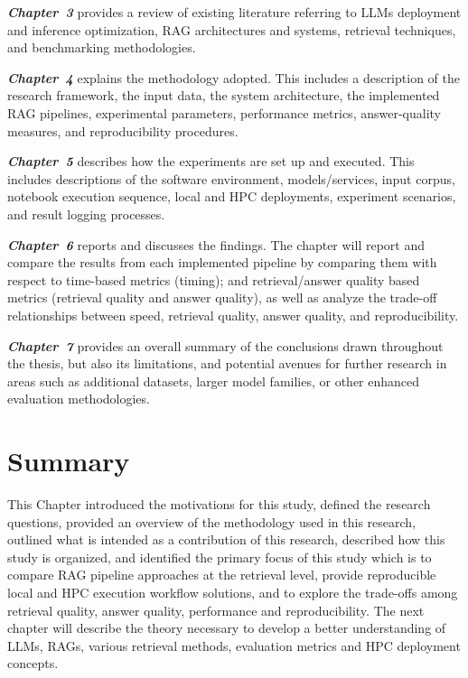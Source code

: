 \textit{\textbf{Chapter~3}} provides a review of existing literature referring to \acp{LLM} deployment and inference optimization, \ac{RAG} architectures and systems, retrieval techniques, and benchmarking methodologies.

\textit{\textbf{Chapter~4}} explains the methodology adopted. This includes a description of the research framework, the input data, the system architecture, the implemented \ac{RAG} pipelines, experimental parameters, performance metrics, answer-quality measures, and reproducibility procedures.

\textit{\textbf{Chapter~5}} describes how the experiments are set up and executed. This includes descriptions of the software environment, models/services, input corpus, notebook execution sequence, local and \ac{HPC} deployments, experiment scenarios, and result logging processes.

\textit{\textbf{Chapter~6}} reports and discusses the findings. The chapter will report and compare the results from each implemented pipeline by comparing them with respect to time-based metrics (timing); and retrieval/answer quality based metrics (retrieval quality and answer quality), as well as analyze the trade-off relationships between speed, retrieval quality, answer quality, and reproducibility.

\textit{\textbf{Chapter~7}} provides an overall summary of the conclusions drawn throughout the thesis, but also its limitations, and potential avenues for further research in areas such as additional datasets, larger model families, or other enhanced evaluation methodologies.

\section{Summary}

This Chapter introduced the motivations for this study, defined the research questions, provided an overview of the methodology used in this research, outlined what is intended as a contribution of this research, described how this study is organized, and identified the primary focus of this study which is to compare \ac{RAG} pipeline approaches at the retrieval level, provide reproducible local and \ac{HPC} execution workflow solutions, and to explore the trade-offs among retrieval quality, answer quality, performance and reproducibility. 
The next chapter will describe the theory necessary to develop a better understanding of \acp{LLM}, \acp{RAG}, various retrieval methods, evaluation metrics and HPC deployment concepts.
